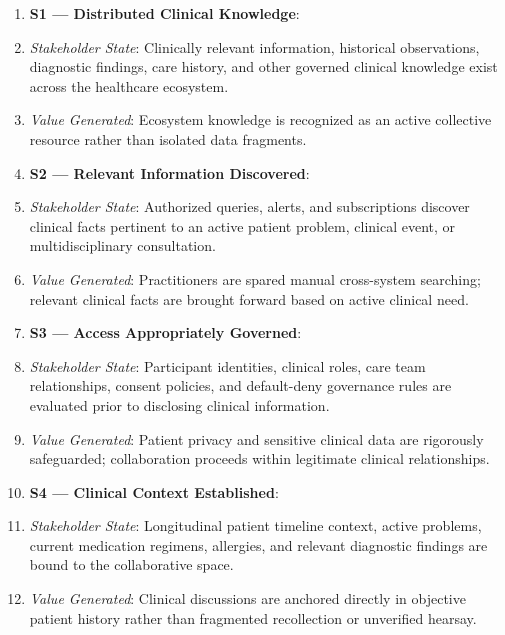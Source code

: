 \begin{enumerate}


\item \textbf{S1 — Distributed Clinical Knowledge}:

\item \emph{Stakeholder State}: Clinically relevant information, historical observations, diagnostic findings, care history, and other governed clinical knowledge exist across the healthcare ecosystem.

\item \emph{Value Generated}: Ecosystem knowledge is recognized as an active collective resource rather than isolated data fragments.

\item \textbf{S2 — Relevant Information Discovered}:

\item \emph{Stakeholder State}: Authorized queries, alerts, and subscriptions discover clinical facts pertinent to an active patient problem, clinical event, or multidisciplinary consultation.

\item \emph{Value Generated}: Practitioners are spared manual cross-system searching; relevant clinical facts are brought forward based on active clinical need.

\item \textbf{S3 — Access Appropriately Governed}:

\item \emph{Stakeholder State}: Participant identities, clinical roles, care team relationships, consent policies, and default-deny governance rules are evaluated prior to disclosing clinical information.

\item \emph{Value Generated}: Patient privacy and sensitive clinical data are rigorously safeguarded; collaboration proceeds within legitimate clinical relationships.

\item \textbf{S4 — Clinical Context Established}:

\item \emph{Stakeholder State}: Longitudinal patient timeline context, active problems, current medication regimens, allergies, and relevant diagnostic findings are bound to the collaborative space.

\item \emph{Value Generated}: Clinical discussions are anchored directly in objective patient history rather than fragmented recollection or unverified hearsay.


\end{enumerate}
